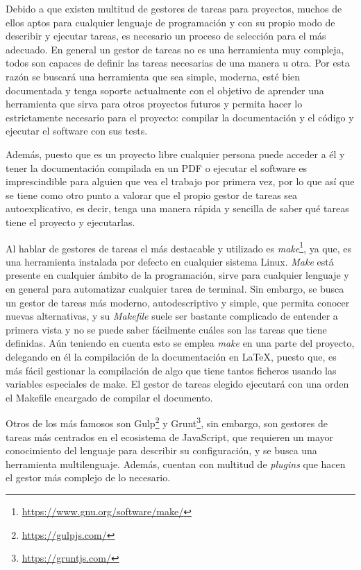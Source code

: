 Debido a que existen multitud de gestores de tareas para proyectos, muchos de
ellos aptos para cualquier lenguaje de programación y con su propio modo de
describir y ejecutar tareas, es necesario un proceso de selección para el más
adecuado. En general un gestor de tareas no es una herramienta muy compleja,
todos son capaces de definir las tareas necesarias de una manera u otra. Por
esta razón se buscará una herramienta que sea simple, moderna, esté bien
documentada y tenga soporte actualmente con el objetivo de aprender una
herramienta que sirva para otros proyectos futuros y permita hacer lo
estrictamente necesario para el proyecto: compilar la documentación y el código
y ejecutar el software con sus tests. 

Además, puesto que es un proyecto libre cualquier persona puede acceder a él y
tener la documentación compilada en un PDF o ejecutar el software es
imprescindible para alguien que vea el trabajo por primera vez, por lo que así
que se tiene como otro punto a valorar que el propio gestor de tareas sea
autoexplicativo, es decir, tenga una manera rápida y sencilla de saber qué
tareas tiene el proyecto y ejecutarlas.

Al hablar de gestores de tareas el más destacable y utilizado es
\textit{make}\footnote{\url{https://www.gnu.org/software/make/}}, ya que, es una
herramienta instalada por defecto en cualquier sistema Linux. \textit{Make} está
presente en cualquier ámbito de la programación, sirve para cualquier lenguaje y
en general para automatizar cualquier tarea de terminal. Sin embargo, se busca
un gestor de tareas más moderno, autodescriptivo y simple, que permita conocer
nuevas alternativas, y su \textit{Makefile} suele ser bastante complicado de
entender a primera vista y no se puede saber fácilmente cuáles son las tareas
que tiene definidas. Aún teniendo en cuenta esto se emplea \textit{make} en una
parte del proyecto, delegando en él la compilación de la documentación en LaTeX,
puesto que, es más fácil gestionar la compilación de algo que tiene tantos
ficheros usando las variables especiales de make. El gestor de tareas elegido
ejecutará con una orden el Makefile encargado de compilar el documento.

Otros de los más famosos son Gulp\footnote{\url{https://gulpjs.com/}} y
Grunt\footnote{\url{https://gruntjs.com/}}, sin embargo, son gestores de tareas
más centrados en el ecosistema de JavaScript, que requieren un mayor
conocimiento del lenguaje para describir su configuración, y se busca una
herramienta multilenguaje. Además, cuentan con multitud de \textit{plugins} que
hacen el gestor más complejo de lo necesario.

